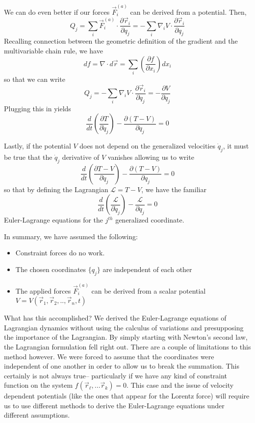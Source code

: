 \documentclass{article}
\begin{document}
We can do even better if our forces $\vec{F}_i^{(a)}$ can be derived from a
potential. Then, 
\begin{equation}
  Q_j = \sum_i \vec{F}_i^{(a)}\cdot\frac{\partial \vec{r}_i}{\partial q_j} = -\sum_i\nabla_i V\cdot\frac{\partial \vec{r}_i}{\partial q_j}
\end{equation}
Recalling connection between the geometric definition of the gradient and the
multivariable chain rule, we have
\begin{equation}
  df = \nabla\cdot d\vec{r} = \sum_i\left(\frac{\partial f}{\partial x_i} \right)dx_i
\end{equation}
so that we can write
\begin{equation}
  Q_j = -\sum_i\nabla_iV\cdot\frac{\partial\vec{r}_i}{\partial q_j} = -\frac{\partial V}{\partial q_j}
\end{equation}
Plugging this in yields
\begin{equation}
  \frac{d}{dt}\left( \frac{\partial T}{\partial \dot{q}_j} \right) - \frac{\partial(T-V)}{\partial q_j} = 0 
\end{equation}

Lastly, if the potential $V$ does not depend on the generalized velocities
$\dot{q}_j$, it must be true that the $\dot{q}_j$ derivative of $V$ vanishes
allowing us to write
\begin{equation}
  \frac{d}{dt}\left( \frac{\partial T-V}{\partial \dot{q}_j} \right) - \frac{\partial(T-V)}{\partial q_j} = 0 
\end{equation}
so that by defining the Lagrangian $\mathcal{L}=T-V$, we have the familiar
\begin{equation}
  \frac{d}{dt}\left( \frac{\mathcal{L}}{\partial \dot{q}_j} \right) - \frac{\mathcal{L}}{\partial q_j} = 0 
\end{equation}
Euler-Lagrange equations for the $j^{th}$ generalized coordinate.


In summary, we have assumed the following:
\begin{itemize}
\item Constraint forces do no work.
\item The chosen coordinates $\{q_j\}$ are independent of each other
\item The applied forces $\vec{F}_i^{(a)}$ can be derived from a scalar
  potential $V=V(\vec{r}_1,\vec{r}_2,..,\vec{r}_n, t)$
\end{itemize}


What has this accomplished? We derived the Euler-Lagrange equations of
Lagrangian dynamics without using the calculus of variations and presupposing
the importance of the Lagrangian. By simply starting with Newton's second law,
the Lagrangian formulation fell right out. There are a couple of limitations to
this method however. We were forced to assume that the coordinates were
independent of one another in order to allow us to break the summation. This
certainly is not always true-- particularly if we have any kind of constraint
function on the system $f(\vec{r}_\ell,...\vec{r}_k)=0$. This case and the issue
of velocity dependent potentials (like the ones that appear for the Lorentz
force) will require us to use different methods to derive the Euler-Lagrange
equations under different assumptions. 
\end{document}

